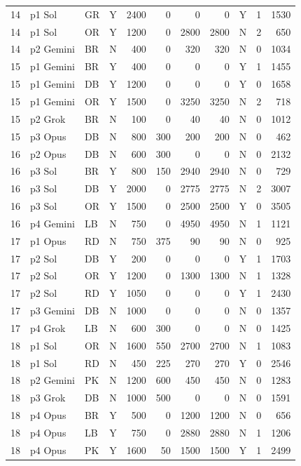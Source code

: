 \begin{longtable}{r l l l r r r r l r r}
14 & p1 Sol & GR & Y & 2400 & 0 & 0 & 0 & Y & 1 & 1530 \\
14 & p1 Sol & OR & Y & 1200 & 0 & 2800 & 2800 & N & 2 & 650 \\
14 & p2 Gemini & BR & N & 400 & 0 & 320 & 320 & N & 0 & 1034 \\
15 & p1 Gemini & BR & Y & 400 & 0 & 0 & 0 & Y & 1 & 1455 \\
15 & p1 Gemini & DB & Y & 1200 & 0 & 0 & 0 & Y & 0 & 1658 \\
15 & p1 Gemini & OR & Y & 1500 & 0 & 3250 & 3250 & N & 2 & 718 \\
15 & p2 Grok & BR & N & 100 & 0 & 40 & 40 & N & 0 & 1012 \\
15 & p3 Opus & DB & N & 800 & 300 & 200 & 200 & N & 0 & 462 \\
16 & p2 Opus & DB & N & 600 & 300 & 0 & 0 & N & 0 & 2132 \\
16 & p3 Sol & BR & Y & 800 & 150 & 2940 & 2940 & N & 0 & 729 \\
16 & p3 Sol & DB & Y & 2000 & 0 & 2775 & 2775 & N & 2 & 3007 \\
16 & p3 Sol & OR & Y & 1500 & 0 & 2500 & 2500 & Y & 0 & 3505 \\
16 & p4 Gemini & LB & N & 750 & 0 & 4950 & 4950 & N & 1 & 1121 \\
17 & p1 Opus & RD & N & 750 & 375 & 90 & 90 & N & 0 & 925 \\
17 & p2 Sol & DB & Y & 200 & 0 & 0 & 0 & Y & 1 & 1703 \\
17 & p2 Sol & OR & Y & 1200 & 0 & 1300 & 1300 & N & 1 & 1328 \\
17 & p2 Sol & RD & Y & 1050 & 0 & 0 & 0 & Y & 1 & 2430 \\
17 & p3 Gemini & DB & N & 1000 & 0 & 0 & 0 & N & 0 & 1357 \\
17 & p4 Grok & LB & N & 600 & 300 & 0 & 0 & N & 0 & 1425 \\
18 & p1 Sol & OR & N & 1600 & 550 & 2700 & 2700 & N & 1 & 1083 \\
18 & p1 Sol & RD & N & 450 & 225 & 270 & 270 & Y & 0 & 2546 \\
18 & p2 Gemini & PK & N & 1200 & 600 & 450 & 450 & N & 0 & 1283 \\
18 & p3 Grok & DB & N & 1000 & 500 & 0 & 0 & N & 0 & 1591 \\
18 & p4 Opus & BR & Y & 500 & 0 & 1200 & 1200 & N & 0 & 656 \\
18 & p4 Opus & LB & Y & 750 & 0 & 2880 & 2880 & N & 1 & 1206 \\
18 & p4 Opus & PK & Y & 1600 & 50 & 1500 & 1500 & Y & 1 & 2499 \\

\end{longtable}
